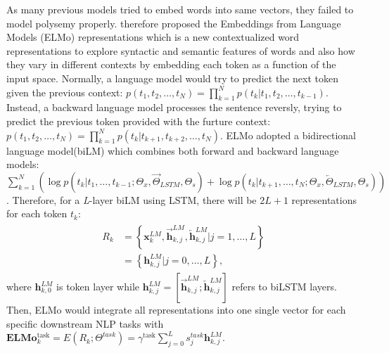 \documentclass[12pt]{diazessay} %
\begin{document}
{As many previous models tried to embed words into same vectors, they failed to model polysemy properly. \citet{peters2018deep} therefore proposed the Embeddings from Language Models (ELMo) representations which is a new contextualized word representations to explore syntactic and semantic features of words and also how they vary in different contexts by embedding each token as a function of the input space. Normally, a language model would try to predict the next token given the previous context: $p \left( t _ { 1 } , t _ { 2 } , \ldots , t _ { N } \right) = \prod _ { k = 1 } ^ { N } p \left( t _ { k } | t _ { 1 } , t _ { 2 } , \ldots , t _ { k - 1 } \right)$. Instead, a backward language model processes the sentence reversly, trying to predict the previous token provided with the furture context: $p \left( t _ { 1 } , t _ { 2 } , \ldots , t _ { N } \right) = \prod _ { k = 1 } ^ { N } p \left( t _ { k } | t _ { k + 1 } , t _ { k + 2 } , \ldots , t _ { N } \right)$. ELMo adopted a bidirectional language model(biLM) which combines both forward and backward language models: $\sum _ { k = 1 } ^ { N } ( \log p \left( t _ { k } | t _ { 1 } , \ldots , t _ { k - 1 } ; \Theta _ { x } , \overrightarrow { \Theta } _ { L S T M } , \Theta _ { s } \right) + \log p \left( t _ { k } | t _ { k + 1 } , \ldots , t _ { N } ; \Theta _ { x } , \overleftarrow{\Theta } _ { L S T M } , \Theta _ { s } \right) )$. Therefore, for a \textit{L}-layer biLM using LSTM, there will be $2L+1$ representations for each token $t_k$:
\begin{align} 
\begin{split}
  R _ { k } & = \left\{ \mathbf { x } _ { k } ^ { L M } , \overrightarrow { \mathbf { h } } _ { k , j } ^ { L M } , \overleftarrow { \mathbf { h } } _ { k , j } ^ { L M } | j = 1 , \ldots , L \right\} \\ & = \left\{ \mathbf { h } _ { k , j } ^ { L M } | j = 0 , \ldots , L \right\},
\end{split}         
\end{align}
where $\mathbf { h } _ { k , 0 } ^ { L M }$ is token layer while ${ \mathbf { h } } _ { k , j } ^ { L M } = [\overrightarrow { \mathbf { h } } _ { k , j } ^ { L M } ; \overleftarrow { \mathbf { h } } _ { k , j } ^ { L M }]$ refers to biLSTM layers. Then, ELMo would integrate all representations into one single vector for each specific downstream NLP tasks with $\mathbf { E } \mathbf { L } \mathbf { M } \mathbf { o } _ { k } ^ { \operatorname { task } } = E \left( R _ { k } ; \Theta ^ { t a s k } \right) = \gamma ^ { \operatorname { task } } \sum _ { j = 0 } ^ { L } s _ { j } ^ { t a s k } \mathbf { h } _ { k , j } ^ { L M }$.

}
\end{document}

